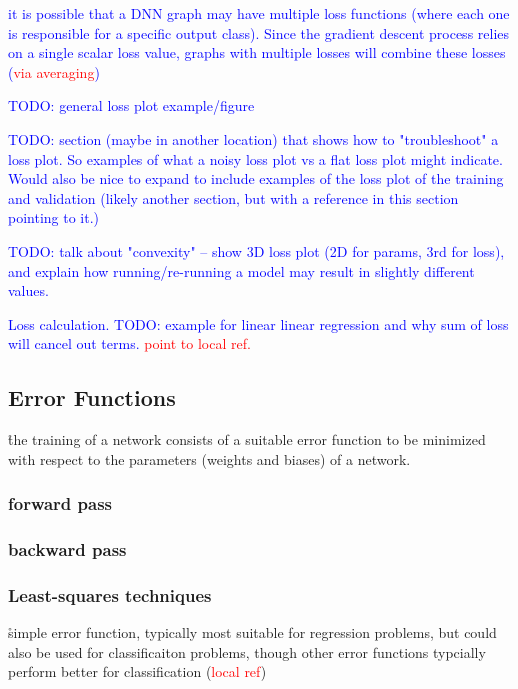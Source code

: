 \textcolor{blue}{it is possible that a DNN graph may have multiple loss functions (where each one is responsible for a specific output class). Since the gradient descent process relies on a single scalar loss value, graphs with multiple losses will combine these losses (\textcolor{red}{via averaging})}

\textcolor{blue}{TODO: general loss plot example/figure}

\textcolor{blue}{TODO: section (maybe in another location) that shows how to "troubleshoot" a loss plot. So examples of what a noisy loss plot vs a flat loss plot might indicate. Would also be nice to expand to include examples of the loss plot of the training and validation (likely another section, but with a reference in this section pointing to it.)}

\textcolor{blue}{TODO: talk about "convexity" -- show 3D loss plot (2D for params, 3rd for loss), and explain how running/re-running a model may result in slightly different values.}

\textcolor{blue}{Loss calculation. TODO: example for linear linear regression and why sum of loss will cancel out terms. \textcolor{red}{point to local ref.}}

\subsection{Error Functions}


\r{the training of a network consists of a suitable error function to be minimized with respect to the parameters (weights and biases) of a network.}



\subsubsection{forward pass}

\subsubsection{backward pass}

\subsubsection{Least-squares techniques}

\r{simple error function, typically most suitable for regression problems, but could also be used for classificaiton problems, though other error functions typcially perform better for classification (\textcolor{red}{local ref})}

